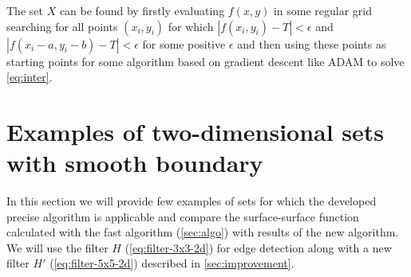 \documentclass[reprint,amsmath,amssymb,aps,pre,showkeys,showpacs]{revtex4-1}
\begin{document}
The set $X$ can be found by firstly evaluating $f(x, y)$ in some regular grid
searching for all points $(x_i, y_i)$ for which $|f(x_i, y_i) - T| < \epsilon$
and $|f(x_i - a, y_i - b) - T| < \epsilon$ for some positive $\epsilon$
and then using these points as starting points for some algorithm based on
gradient descent like ADAM to solve \cref{eq:inter}.

\section{Examples of two-dimensional sets with smooth boundary}
\label{seq:examples}
In this section we will provide few examples of sets for which the developed
precise algorithm is applicable and compare the surface-surface function
calculated with the fast algorithm (\cref{sec:algo}) with results of the new
algorithm. We will use the filter $H$ (\ref{eq:filter-3x3-2d}) for edge
detection along with a new filter $H'$ (\ref{eq:filter-5x5-2d}) described in
\cref{sec:improvement}.
\end{document}
